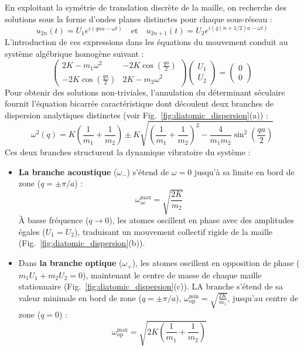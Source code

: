 En exploitant la symétrie de translation discrète de la maille, on recherche des solutions sous la forme d'ondes planes distinctes pour chaque sous-réseau :
\begin{equation*}
    u_{2n}(t) = U_1 e^{i(q n a - \omega t)} \quad \text{et} \quad u_{2n+1}(t) = U_2 e^{i\left(q \left(n + 1/2\right) a - \omega t\right)}
\end{equation*}
L'introduction de ces expressions dans les équations du mouvement conduit au système algébrique homogène suivant :
\begin{equation*}
    \begin{pmatrix}
        2K - m_1 \omega^2 & -2K \cos\left(\frac{qa}{2}\right) \\
        -2K \cos\left(\frac{qa}{2}\right) & 2K - m_2 \omega^2
    \end{pmatrix}
    \begin{pmatrix}
        U_1 \\
        U_2
    \end{pmatrix} = 
    \begin{pmatrix}
        0 \\
        0
    \end{pmatrix}
\end{equation*}
Pour obtenir des solutions non-triviales, l'annulation du déterminant séculaire fournit l'équation bicarrée caractéristique dont découlent deux branches de dispersion analytiques distinctes (voir Fig.~\ref{fig:diatomic_dispersion}(a)) :
\begin{equation}
    \omega^2(q) = K \left( \frac{1}{m_1} + \frac{1}{m_2} \right) \pm K \sqrt{\left(\frac{1}{m_1} + \frac{1}{m_2}\right)^2 - \frac{4}{m_1 m_2} \sin^2\left(\frac{qa}{2}\right)}
\end{equation}
Ces deux branches structurent la dynamique vibratoire du système :
\begin{itemize}
    \item \textbf{La branche acoustique} ($\omega_-$) s'étend de $\omega = 0$ jusqu'à sa limite en bord de zone ($q = \pm \pi/a$) :
    \begin{equation*}
        \omega_{\text{ac}}^{\max} = \sqrt{\frac{2K}{m_2}}
    \end{equation*}
    À basse fréquence ($q \to 0$), les atomes oscillent en phase avec des amplitudes égales ($U_1 = U_2$), traduisant un mouvement collectif rigide de la maille (Fig.~\ref{fig:diatomic_dispersion}(b)).
    \item Dans \textbf{la branche optique} ($\omega_+$), les atomes oscillent en opposition de phase ($m_1 U_1 + m_2 U_2 = 0$), maintenant le centre de masse de chaque maille stationnaire (Fig.~\ref{fig:diatomic_dispersion}(c)). LA branche s'étend de sa valeur minimale en bord de zone ($q = \pm \pi/a$), $\omega_{\text{op}}^{\min} = \sqrt{\frac{2K}{m_1}}$, jusqu'au centre de zone ($q = 0$) :
    \begin{equation*}
        \omega_{\text{op}}^{\max} = \sqrt{2K \left(\frac{1}{m_1} + \frac{1}{m_2}\right)}
    \end{equation*}
\end{itemize}

